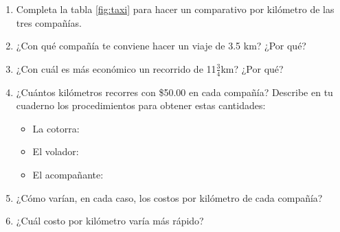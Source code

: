 \documentclass[11pt]{book}
\begin{document}
\begin{enumerate}
        \begin{enumerate}
          \item Completa la tabla \ref{fig:taxi} para hacer un comparativo por kilómetro de las tres compañías.
          \item ¿Con qué compañía te conviene hacer un viaje de 3.5 km? ¿Por qué?
          \item ¿Con cuál es más económico un recorrido de 11$\frac{3}{4}$km? ¿Por qué?
          \item ¿Cuántos kilómetros recorres con \$50.00 en cada compañía? Describe en tu cuaderno los procedimientos
                para obtener estas cantidades:
                \begin{itemize}
                  \item La cotorra:
                  \item El volador:
                  \item El acompañante:
                \end{itemize}
          \item ¿Cómo varían, en cada caso, los costos por kilómetro de cada compañía?
          \item ¿Cuál costo por kilómetro varía más rápido?


\end{enumerate}
\end{enumerate}
\end{document}
